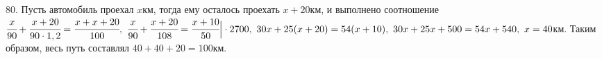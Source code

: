80. Пусть автомобиль проехал $x$км, тогда ему осталось проехать $x+20$км, и выполнено соотношение $\cfrac{x}{90}+\cfrac{x+20}{90\cdot1,2}=\cfrac{x+x+20}{100},\
\cfrac{x}{90}+\cfrac{x+20}{108}=\cfrac{x+10}{50}\Big|\cdot2700,\
30x+25(x+20)=54(x+10),\ 30x+25x+500=54x+540,\ x=40$км. Таким образом, весь путь составлял $40+40+20=100$км.\\
